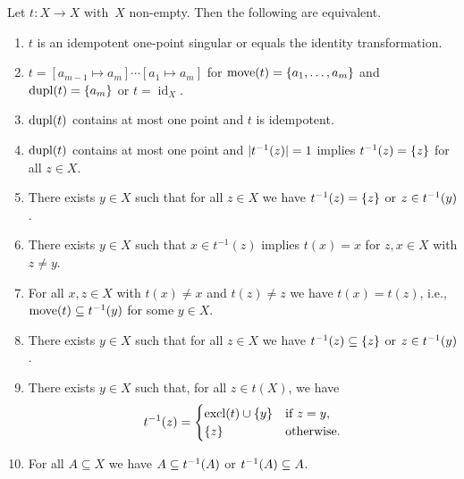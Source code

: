 \begin{theorem}
	\label{prelim:thm::one-attractor-idempotent}
	Let $t \colon X \to X$ with~$X$ non-empty. Then the following are equivalent.
	\begin{enumerate}
	\item \label{prelim:prop:item:one-attractor} 
	$t$ is an idempotent one-point singular or equals the identity transformation.

    \item \label{prelim:prop:item:equation}
    $t = [a_{m-1}\mapsto a_m] \cdots [a_1 \mapsto a_m]$
    for $\move{t} = \{ a_1, \ldots, a_m \}$ and $\dupl{t} = \{a_m\}$ or $t = \operatorname{id}_X$.

    \item \label{prelim:prop:item:one-attractor-a} 
    $\dupl{t}$ contains at most one point and $t$ is idempotent.

	\item \label{prelim:prop:item:oneattractor-single} $\dupl{t}$ contains at most one point
	and $|\applyfunc{z}{t^{-1}}| = 1$ implies $\applyfunc{z}{t^{-1}} = \{z\}$
	for all $z \in X$.
		
	\item  \label{prelim:prop:item:invimg1}  There exists $y \in X$ such that for all $z \in X$
	we have $\applyfunc{z}{t^{-1}} = \{z\}$
	or $z \in \applyfunc{y}{t^{-1}}$.
	
	\item  \label{prelim:prop:item:invimg1a} There exists $y \in X$
	such that $x \in t^{-1}(z)$ implies $t(x) = x$ for $z,x\in X$ with $z \ne y$.	
	
	\item  \label{prelim:prop:item:mapping} For all $x,z \in X$ 
	with $t(x) \ne x$ and $t(z) \ne z$
	we have $t(x) = t(z)$, i.e., $\move{t} \subseteq t^{-1}(y)$ for some $y \in X$.
	
	\item \label{prelim:prop:item:invimg2} There exists $y \in X$ such that for all $z \in X$
	we have $\applyfunc{z}{t^{-1}} \subseteq \{z\}$
	or $z \in \applyfunc{y}{t^{-1}}$.
	
	\item \label{prelim:prop:item:excluded2} There exists $y \in X$ such that, for all $z \in t(X)$, we have
	\[
	\applyfunc{z}{t^{-1}} = \begin{cases}
		\excl{t} \cup \{y\} & \text{if } z = y, \\
		\{ z \}             & \text{otherwise.}
	\end{cases}
	\]
	
	\item \label{prelim:prop:item:inverse_super_or_subset2} For all $A \subseteq X$ we have
	$A \subseteq \applyfunc{A}{t^{-1}}$ or
	$\applyfunc{A}{t^{-1}} \subseteq A$.
\end{enumerate}
\end{theorem}
